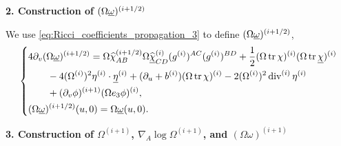 \noindent\textbf{2. Construction of $(\Omega\underline\omega)^{(i+1/2)}$}

We use \eqref{eq:Ricci_coefficients_propagation_3} to define $(\Omega\underline\omega)^{(i+1/2)}$,
\begin{equation}
    \left\{
    \begin{aligned}
        &4\partial_v(\Omega\underline\omega)^{(i+1/2)}=\Omega\widehat\chi^{(i+1/2)}_{AB}\Omega\widehat{\underline\chi}^{(i)}_{CD}(g^{(i)})^{AC}(g^{(i)})^{BD}+\frac{1}{2}(\Omega\operatorname{tr}\chi)^{(i)}(\Omega\operatorname{tr}\underline\chi)^{(i)}\\
        &\qquad-4(\Omega^{(i)})^2\eta^{(i)}\cdot\underline\eta^{(i)}+(\partial_u+b^{(i)})(\Omega\operatorname{tr}\chi)^{(i)}-2(\Omega^{(i)})^2\operatorname{div}^{(i)}\eta^{(i)}\\
        &\qquad+(\partial_v\phi)^{(i+1)}(\Omega e_3\phi)^{(i)},\\
        &(\Omega\underline\omega)^{(i+1/2)}(u,0)=\Omega\underline\omega(u,0).
    \end{aligned}\right.
\end{equation}

\noindent\textbf{3. Construction of $\Omega^{(i+1)}$, $\nabla_A\log\Omega^{(i+1)}$, and $(\Omega\omega)^{(i+1)}$}


